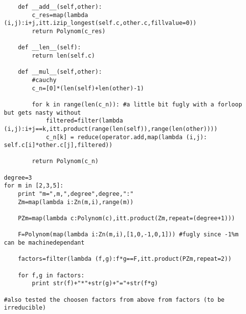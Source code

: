 \documentclass[a4paper,twoside=false,abstract=false,numbers=noenddot,
titlepage=false,headings=small,parskip=half,version=last]{scrartcl}
\theoremstyle{definition}
\theoremstyle{remark}
\begin{document}
\begin{verbatim}
    def __add__(self,other):
        c_res=map(lambda (i,j):i+j,itt.izip_longest(self.c,other.c,fillvalue=0))
        return Polynom(c_res)
    
    def __len__(self):
        return len(self.c)

    def __mul__(self,other):
        #cauchy
        c_n=[0]*(len(self)+len(other)-1)

        for k in range(len(c_n)): #a little bit fugly with a forloop but gets nasty without
            filtered=filter(lambda (i,j):i+j==k,itt.product(range(len(self)),range(len(other))))
            c_n[k] = reduce(operator.add,map(lambda (i,j): self.c[i]*other.c[j],filtered))
        
        return Polynom(c_n)

degree=3
for m in [2,3,5]:
    print "m=",m,",degree",degree,":"
    Zm=map(lambda i:Zn(m,i),range(m))

    PZm=map(lambda c:Polynom(c),itt.product(Zm,repeat=(degree+1)))

    F=Polynom(map(lambda i:Zn(m,i),[1,0,-1,0,1])) #fugly since -1%m can be machinedependant

    factors=filter(lambda (f,g):f*g==F,itt.product(PZm,repeat=2))

    for f,g in factors:
        print str(f)+"*"+str(g)+"="+str(f*g)

#also tested the choosen factors from above from factors (to be irreducible)

\end{verbatim}



\end{document}
